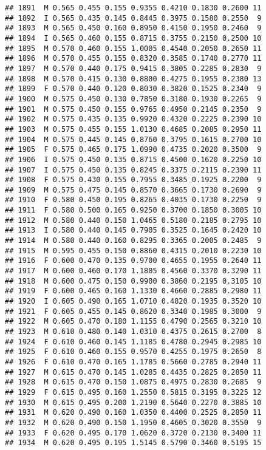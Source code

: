 \documentclass[
]{article}
\begin{document}
\begin{verbatim}
## 1891  M 0.565 0.455 0.155 0.9355 0.4210 0.1830 0.2600 11
## 1892  I 0.565 0.435 0.145 0.8445 0.3975 0.1580 0.2550  9
## 1893  M 0.565 0.450 0.160 0.8950 0.4150 0.1950 0.2460  9
## 1894  I 0.565 0.460 0.155 0.8715 0.3755 0.2150 0.2500 10
## 1895  M 0.570 0.460 0.155 1.0005 0.4540 0.2050 0.2650 11
## 1896  M 0.570 0.455 0.155 0.8320 0.3585 0.1740 0.2770 11
## 1897  M 0.570 0.440 0.175 0.9415 0.3805 0.2285 0.2830  9
## 1898  M 0.570 0.415 0.130 0.8800 0.4275 0.1955 0.2380 13
## 1899  F 0.570 0.440 0.120 0.8030 0.3820 0.1525 0.2340  9
## 1900  M 0.575 0.450 0.130 0.7850 0.3180 0.1930 0.2265  9
## 1901  M 0.575 0.450 0.155 0.9765 0.4950 0.2145 0.2350  9
## 1902  M 0.575 0.435 0.135 0.9920 0.4320 0.2225 0.2390 10
## 1903  M 0.575 0.455 0.155 1.0130 0.4685 0.2085 0.2950 11
## 1904  M 0.575 0.445 0.145 0.8760 0.3795 0.1615 0.2700 10
## 1905  F 0.575 0.465 0.175 1.0990 0.4735 0.2020 0.3500  9
## 1906  I 0.575 0.450 0.135 0.8715 0.4500 0.1620 0.2250 10
## 1907  I 0.575 0.450 0.135 0.8245 0.3375 0.2115 0.2390 11
## 1908  F 0.575 0.430 0.155 0.7955 0.3485 0.1925 0.2200  9
## 1909  M 0.575 0.475 0.145 0.8570 0.3665 0.1730 0.2690  9
## 1910  F 0.580 0.450 0.195 0.8265 0.4035 0.1730 0.2250  9
## 1911  F 0.580 0.500 0.165 0.9250 0.3700 0.1850 0.3005 10
## 1912  M 0.580 0.440 0.150 1.0465 0.5180 0.2185 0.2795 10
## 1913  I 0.580 0.440 0.145 0.7905 0.3525 0.1645 0.2420 10
## 1914  M 0.580 0.440 0.160 0.8295 0.3365 0.2005 0.2485  9
## 1915  M 0.595 0.455 0.150 0.8860 0.4315 0.2010 0.2230 10
## 1916  F 0.600 0.470 0.135 0.9700 0.4655 0.1955 0.2640 11
## 1917  M 0.600 0.460 0.170 1.1805 0.4560 0.3370 0.3290 11
## 1918  M 0.600 0.475 0.150 0.9900 0.3860 0.2195 0.3105 10
## 1919  F 0.600 0.465 0.160 1.1330 0.4660 0.2885 0.2980 11
## 1920  I 0.605 0.490 0.165 1.0710 0.4820 0.1935 0.3520 10
## 1921  F 0.605 0.455 0.145 0.8620 0.3340 0.1985 0.3000  9
## 1922  M 0.605 0.470 0.180 1.1155 0.4790 0.2565 0.3210 10
## 1923  M 0.610 0.480 0.140 1.0310 0.4375 0.2615 0.2700  8
## 1924  F 0.610 0.460 0.145 1.1185 0.4780 0.2945 0.2985 10
## 1925  F 0.610 0.460 0.155 0.9570 0.4255 0.1975 0.2650  8
## 1926  F 0.610 0.470 0.165 1.1785 0.5660 0.2785 0.2940 11
## 1927  M 0.615 0.470 0.145 1.0285 0.4435 0.2825 0.2850 11
## 1928  M 0.615 0.470 0.150 1.0875 0.4975 0.2830 0.2685  9
## 1929  F 0.615 0.495 0.160 1.2550 0.5815 0.3195 0.3225 12
## 1930  M 0.615 0.495 0.200 1.2190 0.5640 0.2270 0.3885 10
## 1931  M 0.620 0.490 0.160 1.0350 0.4400 0.2525 0.2850 11
## 1932  M 0.620 0.490 0.150 1.1950 0.4605 0.3020 0.3550  9
## 1933  F 0.620 0.495 0.170 1.0620 0.3720 0.2130 0.3400 11
## 1934  M 0.620 0.495 0.195 1.5145 0.5790 0.3460 0.5195 15

\end{verbatim}
\end{document}
